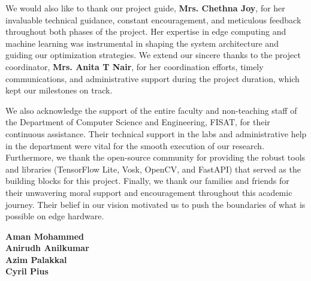\documentclass[12pt,a4paper]{report}
\begin{document}
We would also like to thank our project guide, \textbf{Mrs. Chethna Joy}, for her invaluable technical guidance, constant encouragement, and meticulous feedback throughout both phases of the project. Her expertise in edge computing and machine learning was instrumental in shaping the system architecture and guiding our optimization strategies. We extend our sincere thanks to the project coordinator, \textbf{Mrs. Anita T Nair}, for her coordination efforts, timely communications, and administrative support during the project duration, which kept our milestones on track.

We also acknowledge the support of the entire faculty and non-teaching staff of the Department of Computer Science and Engineering, FISAT, for their continuous assistance. Their technical support in the labs and administrative help in the department were vital for the smooth execution of our research. Furthermore, we thank the open-source community for providing the robust tools and libraries (TensorFlow Lite, Vosk, OpenCV, and FastAPI) that served as the building blocks for this project. Finally, we thank our families and friends for their unwavering moral support and encouragement throughout this academic journey. Their belief in our vision motivated us to push the boundaries of what is possible on edge hardware.

\vspace{1cm}
\begin{flushright}
    \textbf{Aman Mohammed} \\ \textbf{Anirudh Anilkumar} \\ \textbf{Azim Palakkal} \\ \textbf{Cyril Pius}
\end{flushright}

\cleardoublepage
\begingroup
\makeatletter
\let\ps@plain\ps@empty
\makeatother
\pagestyle{empty}  %

\renewcommand{\contentsname}{\centering Contents}
{
\tableofcontents
}

\cleardoublepage

\listoffigures
\cleardoublepage

\listoftables
\cleardoublepage
\endgroup
\cleardoublepage




\pagestyle{fancy}


\end{document}
